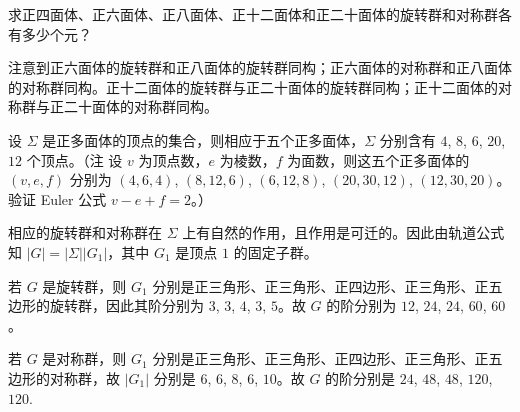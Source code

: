 \documentclass[../../main.tex]{subfiles}%
\begin{document}
\begin{example}
求正四面体、正六面体、正八面体、正十二面体和正二十面体的旋转群和对称群各有多少个元？
\end{example}
\begin{remark}
注意到正六面体的旋转群和正八面体的旋转群同构；正六面体的对称群和正八面体的对称群同构。正十二面体的旋转群与正二十面体的旋转群同构；正十二面体的对称群与正二十面体的对称群同构。
\end{remark}
\begin{solution}
设 $\Sigma$ 是正多面体的顶点的集合，则相应于五个正多面体，$\Sigma$ 分别含有 $4$, $8$, $6$, $20$, $12$ 个顶点。（注 设 $v$ 为顶点数，$e$ 为棱数，$f$ 为面数，则这五个正多面体的 $(v,e,f)$ 分别为 $(4,6,4)$, $(8,12,6)$, $(6,12,8)$, $(20,30,12)$, $(12,30,20)$。验证 Euler 公式 $v - e + f = 2$。）

相应的旋转群和对称群在 $\Sigma$ 上有自然的作用，且作用是可迁的。因此由轨道公式知 $|G| = |\Sigma||G_1|$，其中 $G_1$ 是顶点 $1$ 的固定子群。

若 $G$ 是旋转群，则 $G_1$ 分别是正三角形、正三角形、正四边形、正三角形、正五边形的旋转群，因此其阶分别为 $3$, $3$, $4$, $3$, $5$。故 $G$ 的阶分别为 $12$, $24$, $24$, $60$, $60$。

若 $G$ 是对称群，则 $G_1$ 分别是正三角形、正三角形、正四边形、正三角形、正五边形的对称群，故 $|G_1|$ 分别是 $6$, $6$, $8$, $6$, $10$。故 $G$ 的阶分别是 $24$, $48$, $48$, $120$, $120$.

\end{solution}
\end{document}
